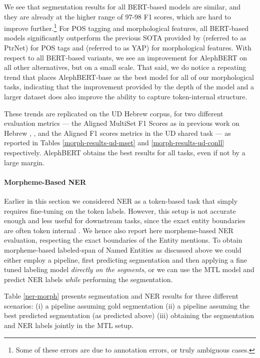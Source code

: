 \documentclass[11pt,a4paper]{article}
\begin{document}
We see that segmentation results for all BERT-based models are  similar, and they are already at the higher range of 97-98 F1 scores, which are hard to improve further.\footnote{Some of these errors are due to annotation errors, or truly ambiguous cases.}  For POS tagging and morphological features, all BERT-based models significantly outperform the previous SOTA provided by \cite{seker-tsarfaty-2020-pointer} (referred to as PtrNet) for POS tags and \cite{more2019tacl} (referred to as YAP) for morphological features. 
With respect to all BERT-based variants, we see an improvement for AlephBERT on all other alternatives, but on a  small scale. That said, we do notice a repeating trend that places   AlephBERT-base as the best model for all of our morphological tasks, indicating that the improvement provided by the depth of the model and  a larger dataset does also improve the ability to capture token-internal structure.

These trends are replicated on the UD Hebrew corpus, for two different evaluation metrics --- the Aligned MultiSet F1 Scores as in previous work on Hebrew    \cite{more2019tacl}, \cite{seker-tsarfaty-2020-pointer},
and the Aligned F1 scores  metrics in the UD shared task \cite{zeman-ud} --- as reported in Tables \ref{morph-results-ud-mset} and \ref{morph-results-ud-conll} respectively. AlephBERT obtains the best results for all tasks, even if not by a large margin.



\paragraph{Morpheme-Based NER}
Earlier in this section we considered NER as a token-based task that simply requires fine-tuning on the token labels. However, this setup is not accurate enough and less useful for downstream tasks, since the exact entity boundaries are often token internal \cite{nemo}.
We hence also report here morpheme-based NER evaluation, respecting the exact  boundaries of the Entity mentions.
To obtain morpheme-based labeled-span of Named Entities as discussed above we could either employ a pipeline, first predicting segmentation and then applying a fine tuned labeling model {\em directly on the segments}, 
or we can use the MTL model and predict NER labels  {\em while}  performing the segmentation.

Table \ref{ner-morph} presents segmentation and NER results for three different scenarios: (i) a pipeline assuming 
gold segmentation (ii)  a pipeline assuming the best predicted segmentation (as predicted above) (iii) obtaining the segmentation and NER labels jointly in the MTL setup.
\end{document}

